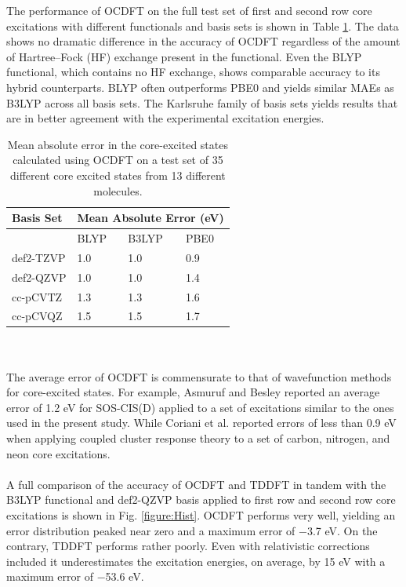\documentclass[12pt]{article}
\begin{document}
The performance of OCDFT on the full test set of first and second row core excitations with different functionals and basis sets is shown in Table \ref{table:OverallPerformance}. The data shows no dramatic difference in the accuracy of OCDFT regardless of the amount of Hartree--Fock (HF) exchange present in the functional. Even the BLYP functional, which contains no HF exchange, shows comparable accuracy to its hybrid counterparts. BLYP often outperforms PBE0 and yields similar MAEs as B3LYP across all basis sets. The Karlsruhe family of basis sets yields results that are in better agreement with the experimental excitation energies.
\begin{table}[!ht]
\centering
    \begin{tabular}{l@{\hskip 0.5in}lll}
    \hline
    \hline
Basis Set & \multicolumn{3}{c}{Mean Absolute Error (eV)}  \\
\hline
& BLYP & B3LYP & PBE0\\
def2-TZVP & 1.0 & 1.0 & 0.9 \\
def2-QZVP & 1.0 & 1.0 & 1.4 \\
cc-pCVTZ & 1.3 & 1.3 & 1.6 \\
cc-pCVQZ & 1.5 & 1.5 & 1.7 \\
\hline
\hline
\end{tabular}
    \caption{Mean absolute error in the core-excited states calculated using OCDFT on a test set of 35 different core excited states from 13 different molecules.}
    \label{table:OverallPerformance}
\end{table}
\\ \\ 
The average error of OCDFT is commensurate to that of wavefunction methods for core-excited states. For example, Asmuruf and Besley\cite{asmuruf_calculation_2008} reported an average error of 1.2 eV for SOS-CIS(D) applied to a set of excitations similar to the ones used in the present study. While Coriani et al.\cite{coriani_coupled-cluster_2012} reported errors of less than 0.9 eV when applying coupled cluster response theory to a set of carbon, nitrogen, and neon core excitations. 
\\ \\
A full comparison of the accuracy of OCDFT and TDDFT in tandem with the B3LYP functional and def2-QZVP basis applied to first row and second row core excitations is shown in Fig. \ref{figure:Hist}. OCDFT performs very well,  yielding an error distribution peaked near zero and a maximum error of $-$3.7 eV. On the contrary, TDDFT performs rather poorly. Even with relativistic corrections included it underestimates the excitation energies, on average, by 15 eV with a maximum error of $-$53.6 eV.
\end{document}
